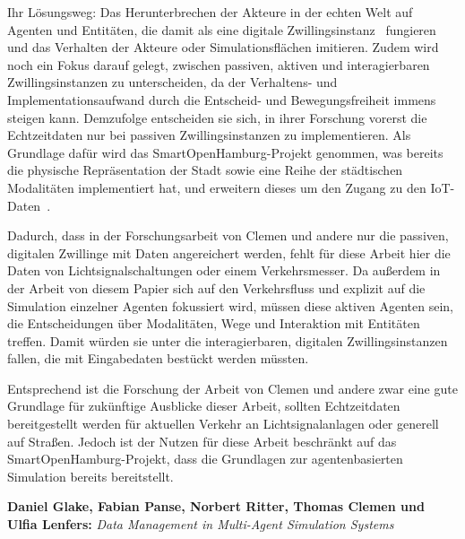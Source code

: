 Ihr Lösungsweg: Das Herunterbrechen der Akteure in der echten Welt auf Agenten und Entitäten, die damit als eine digitale Zwillingsinstanz~\cite{Clemen2021} fungieren und das Verhalten der Akteure oder Simulationsflächen imitieren.
Zudem wird noch ein Fokus darauf gelegt, zwischen passiven, aktiven und interagierbaren Zwillingsinstanzen zu unterscheiden, da der Verhaltens- und Implementationsaufwand durch die Entscheid- und Bewegungsfreiheit immens steigen kann.
Demzufolge entscheiden sie sich, in ihrer Forschung vorerst die Echtzeitdaten nur bei passiven Zwillingsinstanzen zu implementieren.
Als Grundlage dafür wird das SmartOpenHamburg-Projekt genommen, was bereits die physische Repräsentation der Stadt sowie eine Reihe der städtischen Modalitäten implementiert hat, und erweitern dieses um den Zugang zu den IoT-Daten~\cite{Clemen2021}.

Dadurch, dass in der Forschungsarbeit von Clemen und andere nur die passiven, digitalen Zwillinge mit Daten angereichert werden, fehlt für diese Arbeit hier die Daten von Lichtsignalschaltungen oder einem Verkehrsmesser.
Da außerdem in der Arbeit von diesem Papier sich auf den Verkehrsfluss und explizit auf die Simulation einzelner Agenten fokussiert wird, müssen diese aktiven Agenten sein, die Entscheidungen über Modalitäten, Wege und Interaktion mit Entitäten treffen.
Damit würden sie unter die interagierbaren, digitalen Zwillingsinstanzen fallen, die mit Eingabedaten bestückt werden müssten.

Entsprechend ist die Forschung der Arbeit von Clemen und andere zwar eine gute Grundlage für zukünftige Ausblicke dieser Arbeit, sollten Echtzeitdaten bereitgestellt werden für aktuellen Verkehr an Lichtsignalanlagen oder generell auf Straßen.
Jedoch ist der Nutzen für diese Arbeit beschränkt auf das SmartOpenHamburg-Projekt, dass die Grundlagen zur agentenbasierten Simulation bereits bereitstellt.


\textbf{Daniel Glake, Fabian Panse, Norbert Ritter, Thomas Clemen und Ulfia Lenfers:}
\textit{Data Management in Multi-Agent Simulation Systems}


